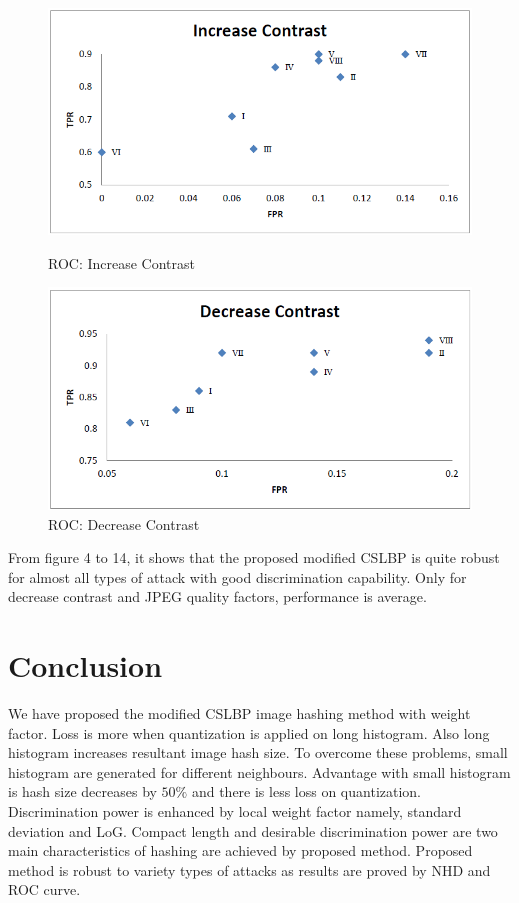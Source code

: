 \documentclass[12pt,a4paper]{jihmsp}
\begin{document}
{{\begin{figure}[h]
	\begin{multicols}{2}
		\includegraphics[width=\linewidth]{10increasecontrast.png}\par\caption{ROC: Increase Contrast}
		\includegraphics[width=\linewidth]{11decreasecontrast.png}\par\caption{ROC: Decrease Contrast}
	\end{multicols}
\end{figure}




From figure 4 to 14, it shows that the proposed modified CSLBP is quite robust for almost all types of attack with good discrimination capability. Only for decrease contrast and JPEG quality factors, performance is average.    



\section{Conclusion}

We have proposed the modified CSLBP image hashing method with weight factor. Loss is more when quantization is applied on long histogram. Also long histogram increases resultant image hash size. To overcome these problems, small histogram are generated for different neighbours. Advantage with small histogram is hash size decreases by $50\%$  and there is less loss on quantization. Discrimination power is enhanced by local weight factor namely, standard deviation and LoG. Compact length and desirable discrimination power are two main characteristics of hashing are achieved by proposed method. Proposed method is robust to variety types of attacks as results are proved by NHD and ROC curve.
	
}}
\end{document}
